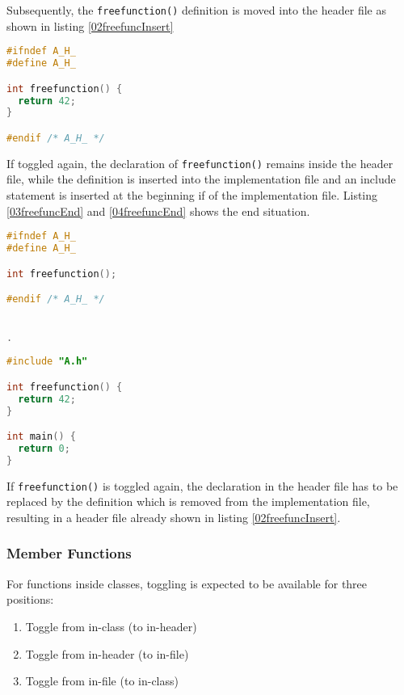Subsequently, the \texttt{freefunction()} definition is moved into the header
file as shown in listing \nolinebreak\ref{02freefuncInsert}

\begin{lstlisting}[caption={Inserted \texttt{freefunction()} in A.h},
label={02freefuncInsert}, language=C++]
#ifndef A_H_
#define A_H_

int freefunction() {
  return 42;
}

#endif /* A_H_ */
\end{lstlisting}

If toggled again, the declaration of \texttt{freefunction()} remains inside the
header file, while the definition is inserted into the implementation file and
an include statement is inserted at the beginning if of the implementation file.
Listing \nolinebreak\ref{03freefuncEnd} and \ref{04freefuncEnd} shows the end
situation.

\vspace{0.5cm}
\begin{minipage}{.48\textwidth}
\lstset{xrightmargin=0.5cm}
\begin{lstlisting}[caption={A.h, inserted decla-\\ration},
label={03freefuncEnd}, language=C++]
#ifndef A_H_
#define A_H_

int freefunction();

#endif /* A_H_ */


.
\end{lstlisting}
\end{minipage}%
\begin{minipage}{.48\textwidth}
\lstset{xleftmargin=0.5cm}
\begin{lstlisting}[caption={A.cpp, inserted defi-\\nition},
label={04freefuncEnd},language=C++]
#include "A.h"

int freefunction() {
  return 42;
}

int main() {
  return 0;
}
\end{lstlisting}
\end{minipage}

If \texttt{freefunction()} is toggled again, the declaration in the header file
has to be replaced by the definition which is removed from the implementation
file, resulting in a header file already shown in listing
\nolinebreak\ref{02freefuncInsert}.

\subsubsection{Member Functions}
For functions inside classes, toggling is expected to be available for three 
positions:
\begin{enumerate}
\item Toggle from in-class (to in-header)
\item Toggle from in-header (to in-file)
\item Toggle from in-file (to in-class)
\end{enumerate}

